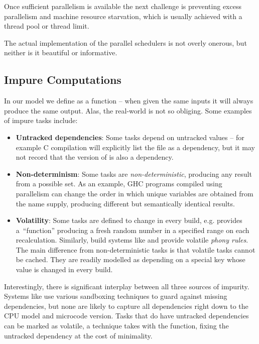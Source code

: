 Once sufficient parallelism is available the next challenge is preventing excess
parallelism and machine resource starvation, which is usually achieved with a
thread pool or thread limit.

The actual implementation of the parallel schedulers is not overly onerous,
but neither is it beautiful or informative.


\subsection{Impure Computations}\label{sec-non-determinism}

In our model we define  as a function -- when given the same inputs
it will always produce the same output. Alas, the real-world is not so obliging.
Some examples of impure tasks include:

\begin{itemize}
\item \textbf{Untracked dependencies}: Some tasks depend on untracked values --
      for example C compilation will explicitly list the  file as
      a dependency, but it may not record that the version of  is also
      a dependency.

\item \textbf{Non-determinism}: Some tasks are \emph{non-deterministic},
      producing any result from a possible set. As an example, GHC programs
      compiled using parallelism can change the order in which unique variables
      are obtained from the name supply, producing different but semantically
      identical results.

\item \textbf{Volatility}: Some tasks are defined to change in every build, e.g.
      \Excel provides a~``function''  producing a fresh random
      number in a specified range on each recalculation. Similarly, build
      systems like \Make and \Shake provide volatile \emph{phony rules}. The
      main difference from non-deterministic tasks is that volatile tasks cannot
      be cached. They are readily modelled as depending on a special key
       whose value is changed in every build.
\end{itemize}

Interestingly, there is significant interplay between all three sources of
impurity. Systems like \Bazel use various sandboxing techniques to guard against
missing dependencies, but none are likely to capture all dependencies right down
to the CPU model and microcode version. Tasks that do have untracked
dependencies can be marked as volatile, a technique \Excel takes with the
 function, fixing the untracked dependency at the cost of
minimality.

